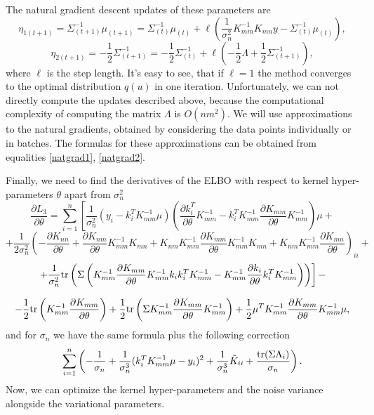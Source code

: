 \documentclass[12pt]{article}
\begin{document}
		The natural gradient descent updates of these parameters are
		$$\eta_{1(t+1)} = \Sigma_{(t+1)}^{-1} \mu_{(t+1)} = \Sigma_{(t)}^{-1} \mu_{(t)} + \ell \left(\frac 1 {\sigma_n^2} K_{mm}^{-1} K_{mn} y - \Sigma_{(t)}^{-1} \mu_{(t)} \right), $$
		$$\eta_{2 (t+1)} = -\frac 1 2 \Sigma_{(t+1)}^{-1} = -\frac 1 2 \Sigma_{(t)}^{-1}  + \ell \left( -\frac 1 2 \Lambda + \frac 1 2 \Sigma_{(t+1)}^{-1}\right),$$
		where $\ell$ is the step length. It's easy to see, that if $\ell = 1$ the method converges to the optimal distribution $q(u)$ in one iteration. Unfortunately, we can not directly compute the updates described above, because the computational complexity of computing the matrix $\Lambda$ is $O(n m^2)$. We will use approximations to the natural gradients, obtained by considering the data points individually or in batches. The formulas for these approximations can be obtained from equalities \ref{natgrad1}, \ref{natgrad2}.
		
		Finally, we need to find the derivatives of the ELBO with respect to kernel hyper-parameters $\theta$ apart from $\sigma_n^2$
		$$\frac{\partial L_3} {\partial \theta} = \sum_{i = 1}^n \left [ \frac 1 {\sigma_n^2} (y_i - k_i^T K_{mm}^{-1} \mu) \left(\frac{\partial k_i^T}{\partial \theta} K_{mm}^{-1} - k_i^T K_{mm}^{-1} \frac{\partial K_{mm}}{\partial \theta} K_{mm}^{-1} \right)\mu + \right.$$
		$$\left. +\frac 1 {2 \sigma_n^2} \left (- \frac{\partial K_{nn}}{\partial \theta} +  \frac{\partial K_{nm}}{\partial \theta} K_{mm}^{-1} K_{mn} + K_{nm} K_{mm}^{-1} \frac{\partial K_{mm}}{\partial \theta} K_{mm}^{-1} K_{mn} + K_{nm} K_{mm}^{-1} \frac{\partial K_{mn}}{\partial \theta}\right)_ {ii} + \right.$$
		$$\left. +  \frac 1 {\sigma_n^2} \mbox{tr}\left( \Sigma \left( K_{mm}^{-1} \frac{\partial K_{mm}}{\partial \theta} K_{mm}^{-1} k_i k_i^T K_{mm}^{-1}  -  K_{mm}^{-1} \frac{\partial k_{i}}{\partial \theta}k_i^T K_{mm}^{-1}\right)\right)\right] - $$

		$$ - \frac 1 2 \mbox{tr}\left(K_{mm}^{-1} \frac{\partial K_{mm}}{\partial \theta}\right) + \frac 1 2 \mbox{tr}\left(\Sigma K_{mm}^{-1} \frac{\partial K_{mm}}{\partial \theta} K_{mm}^{-1} \right)+ \frac 1 2 \mu^T K_{mm}^{-1} \frac{\partial K_{mm}}{\partial \theta} K_{mm}^{-1}\mu,$$
		and for $\sigma_n$ we have the same formula plus the following correction
		$$\sum_{i = 1}^{n} \left(-\frac{1}{\sigma_n} + \frac 1 {\sigma_n^3} (k_i^T K_{mm}^{-1} \mu - y_i)^2 + \frac 1 {\sigma_n^3} \tilde K_{ii} + \frac {\mbox{tr}(\Sigma \Lambda_i)}{\sigma_n}\right).$$
		Now, we can optimize the kernel hyper-parameters and the noise variance alongside the variational parameters. 
		
\end{document}

